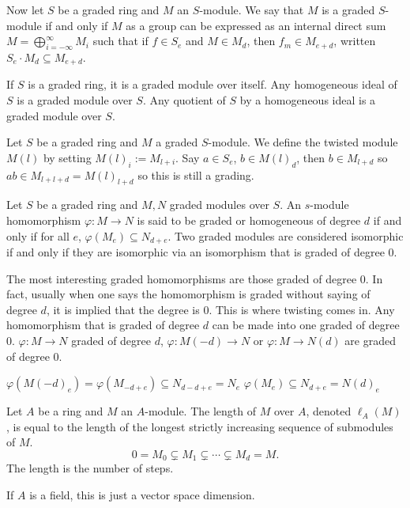 Now let $S$ be a graded ring and $M$ an $S$-module. We say that $M$ is a graded $S$-module if and only if $M$ as a group can be expressed as an internal direct sum $M= \bigoplus_{i= -\infty}^\infty M_i$ such that if $f \in S_e$ and $M \in M_d$, then $f_m \in M_{e+d}$, written $S_e \cdot M_d \subseteq M_{e+d}$.


\begin{ex}
If $S$ is a graded ring, it is a graded module over itself. Any homogeneous ideal of $S$ is a graded module over $S$. Any quotient of $S$ by a homogeneous ideal is a graded module over $S$.

Let $S$ be a graded ring and $M$ a graded $S$-module. We define the twisted module $M(l)$ by setting $M(l)_i := M_{l+i}$. Say $a \in S_e$, $b \in M(l)_d$, then $b \in M_{l+d}$ so $ab \in M_{l+l+d}= M(l)_{l+d}$ so this is still a grading. 
\end{ex}


\begin{dfn}
Let $S$ be a graded ring and $M,N$ graded modules over $S$. An $s$-module homomorphism $\varphi: M \to N$ is said to be graded or homogeneous of degree $d$ if and only if for all $e$, $\varphi(M_e) \subseteq N_{d+e}$. Two graded modules are considered isomorphic if and only if they are isomorphic via an isomorphism that is graded of degree 0.
\end{dfn}


The most interesting graded homomorphisms are those graded of degree 0. In fact, usually when one says the homomorphism is graded without saying of degree $d$, it is implied that the degree is 0. This is where twisting comes in. Any homomorphism that is graded of degree $d$ can be made into one graded of degree 0. $\varphi: M \to N$ graded of degree $d$, $\varphi: M(-d) \to N$ or $\varphi: M \to N(d)$ are graded of degree 0.

$\varphi(M(-d)_e)= \varphi(M_{-d+e}) \subseteq N_{d-d+e}= N_e$
$\varphi(M_e) \subseteq N_{d+e}= N(d)_e$

\begin{dfn}
Let $A$ be a ring and $M$ an $A$-module. The length of $M$ over $A$, denoted $\ell_A(M)$, is equal to the length of the longest strictly increasing sequence of submodules of $M$.
	\[
	0 = M_0 \subsetneq M_1 \subsetneq \cdots \subsetneq M_d= M.
	\]
The length is the number of steps.
\end{dfn}


\begin{ex}
If $A$ is a field, this is just a vector space dimension. 
\end{ex}


